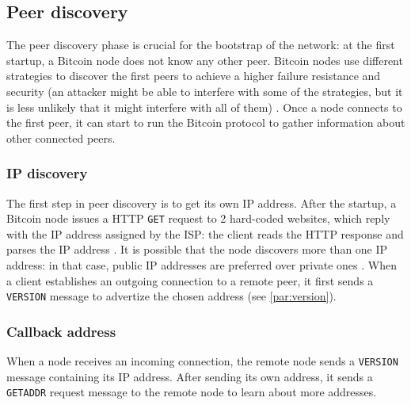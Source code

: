 \subsection{Peer discovery}
\label{sub:discovery}
The peer discovery phase is crucial for the bootstrap of the network:
at the first startup, a Bitcoin node does not know any other peer.
Bitcoin nodes use different strategies to discover the first peers to achieve a higher failure resistance and security (an attacker might be able to interfere with some of the strategies, but it is less unlikely that it might interfere with all of them) \cite{bitcoin_peer_discovery}.
Once a node connects to the first peer, it can start to run the Bitcoin protocol to gather information about other connected peers.

\subsubsection{IP discovery}
The first step in peer discovery is to get its own IP address.
After the startup, a Bitcoin node issues a HTTP \texttt{GET} request to \num{2} hard-coded websites, which reply with the IP address assigned by the \ac{ISP}:
the client reads the HTTP response and parses the IP address \cite{bitcoin_peer_discovery}.
It is possible that the node discovers more than one IP address:
in that case, public IP addresses are preferred over private ones \cite{deanonymisation_2014}.
When a client establishes an outgoing connection to a remote peer, it first sends a \texttt{VERSION} message to advertize the chosen address (see \cref{par:version}).

\subsubsection{Callback address}
When a node receives an incoming connection, the remote node sends a \texttt{VERSION} message containing its IP address.
After sending its own address, it sends a \texttt{GETADDR} request message to the remote node to learn about more addresses.

